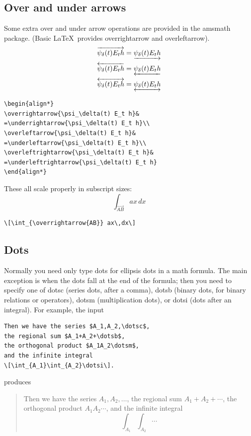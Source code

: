 \documentclass[manuscript, printscheme]{aomart}
\newcommand{\ntt}{\normalfont\ttfamily}
\newcommand{\cn}[1]{{\protect\ntt\bslash#1}}
\newcommand{\pkg}[1]{{\protect\ntt#1}}
\newtheorem[{}\it]{thm}{Theorem}[section]
\theoremstyle{definition}
\newtheorem*[{}\it]{notation}{Notation}
\begin{document}
\subsection{Over and under arrows}
Some extra over and under arrow operations are provided in
the \pkg{amsmath} package.  (Basic \LaTeX\ provides
\cn{overrightarrow} and \cn{overleftarrow}).
\begin{align*}
\overrightarrow{\psi_\delta(t) E_t h}&
=\underrightarrow{\psi_\delta(t) E_t h}\\
\overleftarrow{\psi_\delta(t) E_t h}&
=\underleftarrow{\psi_\delta(t) E_t h}\\
\overleftrightarrow{\psi_\delta(t) E_t h}&
=\underleftrightarrow{\psi_\delta(t) E_t h}
\end{align*}
\begin{verbatim}
\begin{align*}
\overrightarrow{\psi_\delta(t) E_t h}&
=\underrightarrow{\psi_\delta(t) E_t h}\\
\overleftarrow{\psi_\delta(t) E_t h}&
=\underleftarrow{\psi_\delta(t) E_t h}\\
\overleftrightarrow{\psi_\delta(t) E_t h}&
=\underleftrightarrow{\psi_\delta(t) E_t h}
\end{align*}
\end{verbatim}
These all scale properly in subscript sizes:
\[\int_{\overrightarrow{AB}} ax\,dx\]
\begin{verbatim}
\[\int_{\overrightarrow{AB}} ax\,dx\]
\end{verbatim}

\subsection{Dots}

Normally you need only type \cn{dots} for ellipsis dots in a
math formula.  The main exception is when the dots
fall at the end of the formula; then you need to
specify one of \cn{dotsc} (series dots, after a comma),
\cn{dotsb} (binary dots, for binary relations or operators),
\cn{dotsm} (multiplication dots), or \cn{dotsi} (dots after
an integral).  For example, the input
\begin{verbatim}
Then we have the series $A_1,A_2,\dotsc$,
the regional sum $A_1+A_2+\dotsb$,
the orthogonal product $A_1A_2\dotsm$,
and the infinite integral
\[\int_{A_1}\int_{A_2}\dotsi\].
\end{verbatim}
produces
\begin{quotation}
Then we have the series $A_1,A_2,\dotsc$,
the regional sum $A_1+A_2+\dotsb$,
the orthogonal product $A_1A_2\dotsm$,
and the infinite integral
\[\int_{A_1}\int_{A_2}\dotsi\]
\end{quotation}
\end{document}
